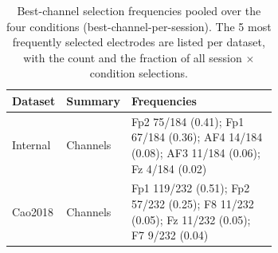 \begin{table}[ht]
  \centering
  \scriptsize
  \setlength{\tabcolsep}{3pt}
  \caption{Best-channel selection frequencies pooled over the four conditions (best-channel-per-session). The 5 most frequently selected electrodes are listed per dataset, with the count and the fraction of all session $\times$ condition selections.}
  \label{tab:channel_selection}
  \begin{tabular}{llp{0.66\linewidth}}
    \toprule
    Dataset & Summary & Frequencies \\
    \midrule
    Internal & Channels & Fp2 75/184 (0.41); Fp1 67/184 (0.36); AF4 14/184 (0.08); AF3 11/184 (0.06); Fz 4/184 (0.02) \\
    Cao2018 & Channels & Fp1 119/232 (0.51); Fp2 57/232 (0.25); F8 11/232 (0.05); Fz 11/232 (0.05); F7 9/232 (0.04) \\
    \bottomrule
  \end{tabular}
\end{table}
